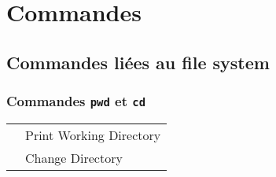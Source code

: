 %
%

\setcounter{remarque-cnt}{1}
\setcounter{example-cnt}{1}
\chapter{Commandes {\Unix}}
\thispagestyle{fancy}

\section{Commandes li{\'e}es au file system}

\subsection{\texorpdfstring{\label{cmds-pwd-cd}Commandes {\tt pwd} et {\tt cd}}{Commandes pwd et cd}}

\begin{tabular}{c@{~=~}l}
	\index{pwd@\texttt{pwd}}{\tt pwd}	&	Print Working Directory \\
	\index{cd@\texttt{cd}}{\tt cd}		&	Change Directory \\
\end{tabular}

